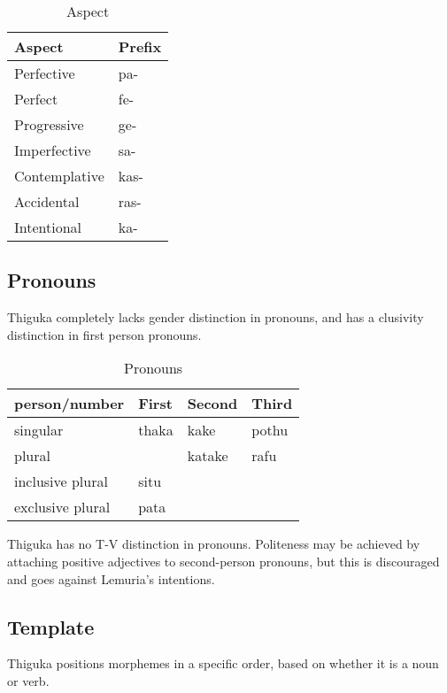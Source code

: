 \begin{table}[h!]
    \centering
    \caption{Aspect}
    \begin{tabularx}{8cm}{|X|X|}
        \hline
        \textbf{Aspect} & \textbf{Prefix} \\
        \hline
        Perfective & pa- \\
        Perfect & fe- \\
        Progressive & ge- \\
        Imperfective & sa- \\
        Contemplative & kas- \\
        Accidental & ras- \\
        Intentional & ka- \\
        \hline
    \end{tabularx}
\end{table}

\subsection{Pronouns}
Thiguka completely lacks gender distinction in pronouns, and has a clusivity distinction in first person pronouns.

\begin{table}[h!]
    \centering
    \caption{Pronouns}
    \begin{tabularx}{15cm}{|X|X|X|X|}
        \hline
        person/number & \textbf{First} & \textbf{Second} & \textbf{Third} \\
        \hline
        singular & thaka & kake & pothu \\
        plural   & & katake & rafu \\
        inclusive plural & situ & & \\
        exclusive plural & pata & & \\
        \hline
    \end{tabularx}
\end{table}

Thiguka has no T-V distinction in pronouns. Politeness may be achieved by attaching positive adjectives to second-person pronouns, but this is discouraged and goes against Lemuria's intentions.

\subsection{Template}
Thiguka positions morphemes in a specific order, based on whether it is a noun or verb.


